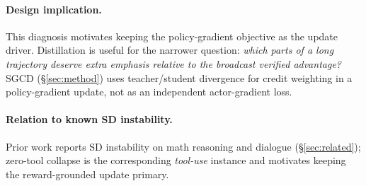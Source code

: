 \paragraph{Design implication.} This diagnosis motivates keeping the
policy-gradient objective as the
update driver. Distillation is useful for the narrower question: \emph{which parts
of a long trajectory deserve extra emphasis relative to the broadcast verified
advantage?} SGCD (\S\ref{sec:method}) uses teacher/student divergence for credit
weighting in a policy-gradient update, not as an independent actor-gradient loss.

\paragraph{Relation to known SD instability.} Prior work reports SD instability
on math reasoning and dialogue (\S\ref{sec:related}); zero-tool collapse is the
corresponding \emph{tool-use} instance and motivates keeping the reward-grounded
update primary.
